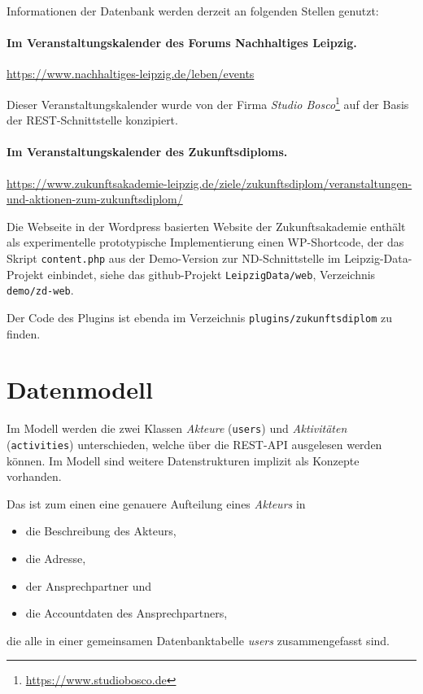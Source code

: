 \documentclass[a4paper,11pt]{article}
\begin{document}
Informationen der Datenbank werden derzeit an folgenden Stellen genutzt:

\paragraph{Im Veranstaltungskalender des Forums Nachhaltiges Leipzig.}
\begin{center}
  \url{https://www.nachhaltiges-leipzig.de/leben/events}
\end{center}
Dieser Veranstaltungskalender wurde von der Firma \emph{Studio
  Bosco}\footnote{\url{https://www.studiobosco.de}} auf der Basis der
REST-Schnittstelle konzipiert. 

\paragraph{Im Veranstaltungskalender des Zukunftsdiploms.}
\begin{center}
  \url{https://www.zukunftsakademie-leipzig.de/ziele/zukunftsdiplom/veranstaltungen-und-aktionen-zum-zukunftsdiplom/}
\end{center}

Die Webseite in der Wordpress basierten Website der Zukunftsakademie enthält
als experimentelle prototypische Implementierung einen WP-Shortcode, der das
Skript \texttt{content.php} aus der Demo-Version zur ND-Schnittstelle im
Leipzig-Data-Projekt einbindet, siehe das github-Projekt
\texttt{LeipzigData/web}, Verzeichnis \texttt{demo/zd-web}.

Der Code des Plugins ist ebenda im Verzeichnis \texttt{plugins/zukunftsdiplom}
zu finden. 

\section{Datenmodell}

Im Modell werden die zwei Klassen \emph{Akteure} (\texttt{users}) und
\emph{Aktivitäten} (\texttt{activities}) unterschieden, welche über die
REST-API ausgelesen werden können.  Im Modell sind weitere Datenstrukturen
implizit als Konzepte vorhanden.

Das ist zum einen eine genauere Aufteilung eines \emph{Akteurs} in
\begin{itemize}\itemsep0pt
\item die Beschreibung des Akteurs,
\item die Adresse,
\item der Ansprechpartner und
\item die Accountdaten des Ansprechpartners,
\end{itemize}
die alle in einer gemeinsamen Datenbanktabelle \emph{users} zusammengefasst
sind.
\end{document}

